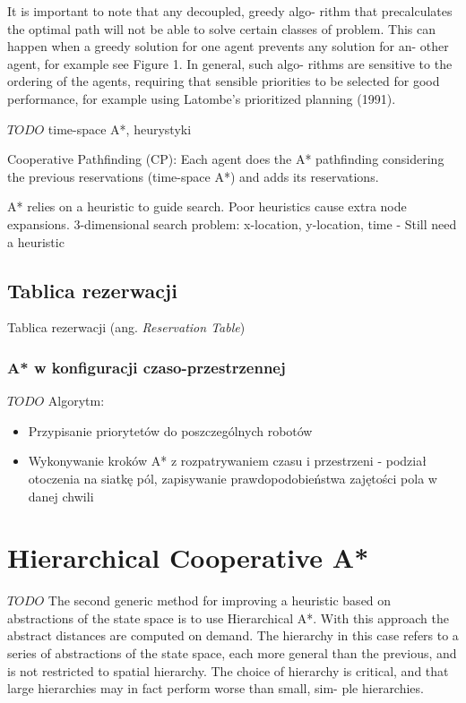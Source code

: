 It is important to note that any decoupled, greedy algo-
rithm that precalculates the optimal path will not be able to
solve certain classes of problem. This can happen when a
greedy solution for one agent prevents any solution for an-
other agent, for example see Figure 1. In general, such algo-
rithms are sensitive to the ordering of the agents, requiring
that sensible priorities to be selected for good performance,
for example using Latombe’s prioritized planning (1991).
\cite{cooppath}

$TODO$
time-space A*,
heurystyki

Cooperative Pathfinding (CP): Each agent does the A* pathfinding
considering the previous reservations (time-space A*) and adds its
reservations.

A* relies on a heuristic to guide search.
Poor heuristics cause extra node expansions.
3-dimensional search problem: x-location, y-location, time - Still need a heuristic

\subsection{Tablica rezerwacji}
Tablica rezerwacji (ang. {\it Reservation Table})

\subsubsection{A* w konfiguracji czaso-przestrzennej}
$TODO$
Algorytm:
\begin{itemize}
	\item Przypisanie priorytetów do poszczególnych robotów
	\item Wykonywanie kroków A* z rozpatrywaniem czasu i przestrzeni - podział otoczenia na siatkę pól, zapisywanie prawdopodobieństwa zajętości pola w danej chwili
\end{itemize}

\section{Hierarchical Cooperative A*}
$TODO$
The second generic method for improving a heuristic based on abstractions of the state space is to use Hierarchical A*.
With this approach the abstract distances are computed on demand. The hierarchy in this case refers to a
series of abstractions of the state space, each more general
than the previous, and is not restricted to spatial hierarchy.
The choice of hierarchy is critical, and that
large hierarchies may in fact perform worse than small, sim-
ple hierarchies.

